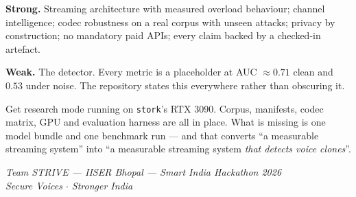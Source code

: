 \documentclass[11pt,a4paper]{article}
\newcommand{\code}[1]{\texttt{\small #1}}
\begin{document}
\textbf{Strong.} Streaming architecture with measured overload behaviour; channel
intelligence; codec robustness on a real corpus with unseen attacks; privacy by
construction; no mandatory paid APIs; every claim backed by a checked-in artefact.

\textbf{Weak.} The detector. Every metric is a placeholder at AUC $\approx 0.71$
clean and $0.53$ under noise. The repository states this everywhere rather than
obscuring it.

\begin{tcolorbox}[colback=strivegrey,colframe=strivenavy,
  title=\textbf{The single highest-leverage move}]
Get research mode running on \code{stork}'s RTX 3090. Corpus, manifests, codec
matrix, GPU and evaluation harness are all in place. What is missing is one model
bundle and one benchmark run --- and that converts ``a measurable streaming system''
into ``a measurable streaming system \emph{that detects voice clones}''.
\end{tcolorbox}

\vspace{0.8cm}
\begin{center}
\color{strivenavy}\itshape
Team STRIVE --- IISER Bhopal --- Smart India Hackathon 2026\\
\normalfont\small Secure Voices $\cdot$ Stronger India
\end{center}
\end{document}
